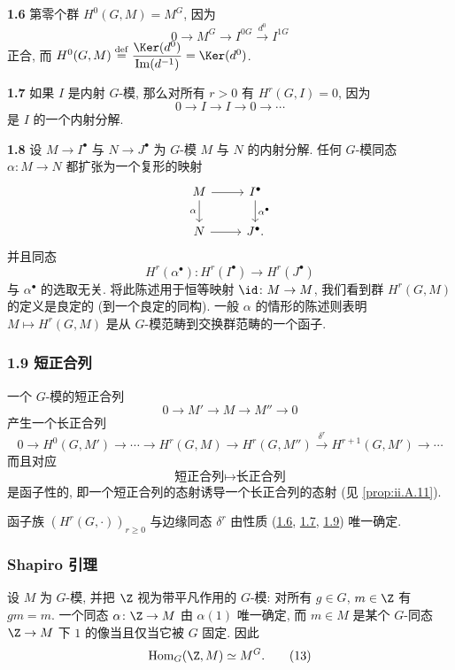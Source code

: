 \noindent{}\hypertarget{item:ii.1.6}{}\textbf{1.6} 第零个群 $H^0(G,M)=M^G$, 因为
\[
 0\to M^G\to I^{0G}\xrightarrow{d^0} I^{1G}
\]
正合, 而 $H^0(G,M)\stackrel{\mathrm{def}}{=}\dfrac{\Ker(d^0)}{\Im(d^{-1})}=\Ker(d^0)$.

\noindent{}\hypertarget{item:ii.1.7}{}\textbf{1.7} 如果 $I$ 是内射 $G$-模, 那么对所有 $r>0$ 有 $H^r(G,I)=0$, 因为
\[
 0\to I\to I\to 0\to\cdots
\]
是 $I$ 的一个内射分解.

\noindent{}\hypertarget{item:ii.1.8}{}\textbf{1.8} 设 $M\to I^\bullet$ 与 $N\to J^\bullet$ 为 $G$-模 $M$ 与 $N$ 的内射分解. 任何 $G$-模同态 $\alpha\colon M\to N$ 都扩张为一个复形的映射
\[
 \begin{tikzcd}
 M \ar[r] \ar[d, "\alpha"'] & I^\bullet \ar[d, "\alpha^\bullet"] \\
 N \ar[r] & J^\bullet.
 \end{tikzcd}
\]
并且同态
\[
 H^r(\alpha^\bullet)\colon H^r(I^\bullet)\to H^r(J^\bullet)
\]
与 $\alpha^\bullet$ 的选取无关. 将此陈述用于恒等映射 $\id\colon M\to M$, 我们看到群 $H^r(G,M)$ 的定义是良定的 (到一个良定的同构). 一般 $\alpha$ 的情形的陈述则表明 $M\mapsto H^r(G,M)$ 是从 $G$-模范畴到交换群范畴的一个函子.

\hypertarget{item:ii.1.9}{}\subsubsection*{1.9 短正合列}

一个 $G$-模的短正合列
\[
 0\to M'\to M\to M''\to 0
\]
产生一个长正合列
\[
 0\to H^0(G,M')\to\cdots\to H^r(G,M)\to H^r(G,M'')\xrightarrow{\delta^r} H^{r+1}(G,M')\to\cdots
\]
而且对应
\[
 \text{短正合列}\mapsto\text{长正合列}
\]
是函子性的, 即一个短正合列的态射诱导一个长正合列的态射 (见 \ref{prop:ii.A.11}).

\setcounter{theorem}{9}
\begin{remark}\label{rem:ii.1.10}
函子族 $(H^r(G,\cdot))_{r\ge 0}$ 与边缘同态 $\delta^r$ 由性质 (\hyperlink{item:ii.1.6}{1.6}, \hyperlink{item:ii.1.7}{1.7}, \hyperlink{item:ii.1.9}{1.9}) 唯一确定.
\end{remark}

\subsubsection*{Shapiro 引理}

设 $M$ 为 $G$-模, 并把 $\Z$ 视为带平凡作用的 $G$-模: 对所有 $g\in G$, $m\in\Z$ 有 $gm=m$. 一个同态 $\alpha\colon \Z\to M$ 由 $\alpha(1)$ 唯一确定, 而 $m\in M$ 是某个 $G$-同态 $\Z\to M$ 下 $1$ 的像当且仅当它被 $G$ 固定. 因此
\begin{equation*}
 \operatorname{Hom}_G(\Z,M)\simeq M^G.
\tag{13}
\end{equation*}

